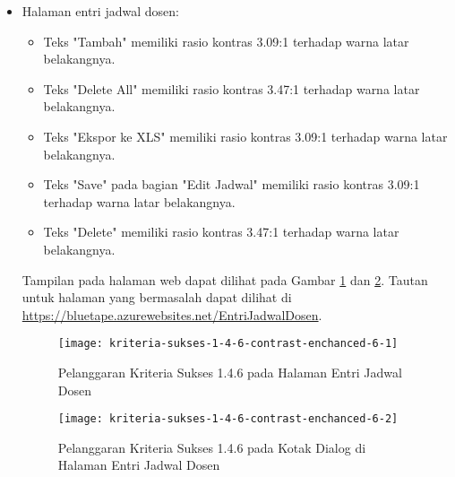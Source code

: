\begin{itemize}
    \item Halaman entri jadwal dosen: 
    \begin{itemize}
        \item Teks "Tambah" memiliki rasio kontras 3.09:1 terhadap warna latar belakangnya.
        \item Teks "Delete All" memiliki rasio kontras 3.47:1 terhadap warna latar belakangnya.
        \item Teks "Ekspor ke XLS" memiliki rasio kontras 3.09:1 terhadap warna latar belakangnya.
        \item Teks "Save" pada bagian "Edit Jadwal" memiliki rasio kontras 3.09:1 terhadap warna latar belakangnya.
        \item Teks "Delete" memiliki rasio kontras 3.47:1 terhadap warna latar belakangnya.
    \end{itemize}
    Tampilan pada halaman web dapat dilihat pada Gambar \ref{fig:1.4.6_contrast_enchanced_6_1} dan \ref{fig:1.4.6_contrast_enchanced_6_2}. Tautan untuk halaman yang bermasalah dapat dilihat di \url{https://bluetape.azurewebsites.net/EntriJadwalDosen}.
    \begin{figure}[H]
        \centering  
        \texttt{[image: kriteria-sukses-1-4-6-contrast-enchanced-6-1]}  
        \caption[Pelanggaran Kriteria Sukses 1.4.6 pada Halaman Entri Jadwal Dosen]{Pelanggaran Kriteria Sukses 1.4.6 pada Halaman Entri Jadwal Dosen}
        \label{fig:1.4.6_contrast_enchanced_6_1}  
    \end{figure} 
    
    \begin{figure}[H]
        \centering  
        \texttt{[image: kriteria-sukses-1-4-6-contrast-enchanced-6-2]}  
        \caption[Pelanggaran Kriteria Sukses 1.4.6 pada Kotak Dialog di Halaman Entri Jadwal Dosen]{Pelanggaran Kriteria Sukses 1.4.6 pada Kotak Dialog di Halaman Entri Jadwal Dosen}
        \label{fig:1.4.6_contrast_enchanced_6_2}  
    \end{figure} 


\end{itemize}
